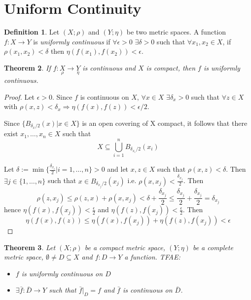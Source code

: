 \documentclass[12pt]{amsbook}
\newtheorem{theorem}{Theorem}[section]
\theoremstyle{definition}
\newtheorem{definition}[theorem]{Definition}
\newcommand{\Ra}{\Rightarrow} %
\newcommand{\ra}{\rightarrow} %
\begin{document}
\section{Uniform Continuity}

\begin{definition}
Let $(X; \rho)$ and $(Y; \eta)$ be two metric spaces. A function $f: X \ra Y$ is \emph{uniformly continuous} if $\forall \epsilon > 0$ $\exists \delta > 0$ such that $\forall x_1, x_2 \in X$, if $\rho(x_1, x_2) < \delta$ then $\eta(f(x_1), f(x_2)) < \epsilon$.
\end{definition}

\begin{theorem}
If $f: \underset{\rho}X \ra \underset{\eta}Y$ is continuous and $X$ is compact, then $f$ is uniformly continuous.
\end{theorem}

\begin{proof}
Let $\epsilon > 0$. Since $f$ is continuous on $X$, $\forall x \in X$ $\exists \delta_x > 0$ such that $\forall z \in X$ with $\rho(x, z) < \delta_x \Ra \eta(f(x), f(z)) < \epsilon/2$.

Since $\{B_{\delta_x/2}(x) | x \in X\}$ is an open covering of X compact, it follows that there exist $x_1, \ldots, x_n \in X$ such that
\begin{equation*}
X \subseteq \bigcup_{i=1}^n B_{\delta_{x_i}/2}(x_i)
\end{equation*}

Let $\delta := \min \{\frac{\delta_{x_i}}{2} | i = 1, \ldots, n \} > 0$ and let $x, z \in X$ such that $\rho(x, z) < \delta$. Then $\exists j \in \{1, \ldots, n\}$ such that $x \in B_{\delta_{x_j}/2}(x_j)$ i.e. $\rho(x, x_j) < \frac{\delta_{x_j}}{2}$. Then
\begin{equation*}
\rho(z, x_j) \leq \rho(z, x) + \rho(x, x_j) < \delta + \frac{\delta_{x_j}}{2} \leq \frac{\delta_{x_j}}{2} + \frac{\delta_{x_j}}{2} = \delta_{x_j}
\end{equation*}
hence $\eta(f(x), f(x_j)) < \frac{\epsilon}{2}$ and $\eta(f(z), f(x_j)) < \frac{\epsilon}{2}$.
Then
\begin{equation*}
\eta(f(x), f(z)) \leq \eta(f(x), f(x_j)) + \eta(f(z), f(x_j)) < \epsilon
\end{equation*}
\end{proof}

\begin{theorem}
Let $(X; \rho)$ be a compact metric space, $(Y; \eta)$ be a complete metric space, $\emptyset \neq D \subseteq X$ and $f: D \ra Y$ a function. TFAE:
\begin{itemize}
\item[(i)] $f$ is uniformly continuous on $D$
\item[(ii)] $\exists \bar f: \bar D \ra Y$ such that $\bar f|_D = f$ and $\bar f$ is continuous on $\bar D$.
\end{itemize}
\end{theorem}
\end{document}
